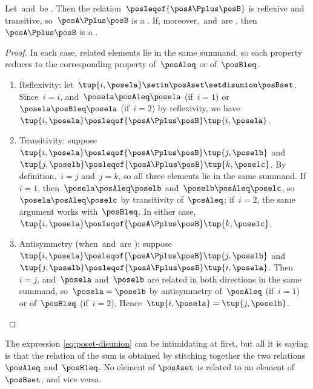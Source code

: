 \begin{lemma}
    \label{lem:sum-preorder}
    Let~\posA and~\posB be .
    Then the relation~$\posleqof{\posA\Pplus\posB}$ is reflexive and transitive, so~$\posA\Pplus\posB$ is a .
    If, moreover,~\posA and~\posB are , then~$\posA\Pplus\posB$ is a .
\end{lemma}
\begin{proof}
    In each case, related elements lie in the same summand, so each property reduces to the corresponding property of~$\posAleq$ or of~$\posBleq$.
    \begin{enumerate}
        \item Reflexivity: let~$\tup{i, \posela}\setin \posAset \setdisunion \posBset$.
        Since~$i = i$, and~$\posela \posAleq \posela$ (if~$i=1$) or~$\posela \posBleq \posela$ (if~$i=2$) by reflexivity, we have~$\tup{i, \posela} \posleqof{\posA\Pplus\posB} \tup{i, \posela}$.
        \item Transitivity: suppose~$\tup{i, \posela} \posleqof{\posA\Pplus\posB} \tup{j, \poselb}$ and~$\tup{j, \poselb} \posleqof{\posA\Pplus\posB} \tup{k, \poselc}$.
        By definition,~$i = j$ and~$j = k$, so all three elements lie in the same summand.
        If~$i = 1$, then~$\posela \posAleq \poselb$ and~$\poselb \posAleq \poselc$, so~$\posela \posAleq \poselc$ by transitivity of~$\posAleq$; if~$i = 2$, the same argument works with~$\posBleq$.
        In either case,~$\tup{i, \posela} \posleqof{\posA\Pplus\posB} \tup{k, \poselc}$.
        \item Antisymmetry (when~\posA and~\posB are ): suppose~$\tup{i, \posela} \posleqof{\posA\Pplus\posB} \tup{j, \poselb}$ and~$\tup{j, \poselb} \posleqof{\posA\Pplus\posB} \tup{i, \posela}$.
        Then~$i = j$, and~$\posela$ and~$\poselb$ are related in both directions in the same summand, so~$\posela = \poselb$ by antisymmetry of~$\posAleq$ (if~$i=1$) or of~$\posBleq$ (if~$i=2$).
        Hence~$\tup{i, \posela} = \tup{j, \poselb}$.
    \end{enumerate}
\end{proof}

The expression \cref{eq:poset-disunion} can be intimidating at first, but all it is saying is that the relation of the sum is obtained by stitching together the two relations~$\posAleq$ and~$\posBleq$.
No element of $\posAset$ is related to an element of $\posBset$, and vice versa.

